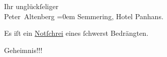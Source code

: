 \pstart
           Ihr unglückſeliger{\\[\baselineskip]}\spacefill\mbox{Peter Altenberg}\pend
           \leftskip=0em{}
\pstart
           \noindent{}Semmering, Hotel Panhans.\pend
           
\pstart
           Es iſt ein \uline{Notſchrei} eines{ }ſchwerst
                  Bedrängten.\pend
           
\pstart
           \raggedleft{}Geheimnis!!!\pend
           \endnumbering{}  \newcommand{\dateiname}{L02094}\newcommand{\titel}{Peter Altenberg an Arthur Schnitzler, [7. 11. 1912]}\newcommand{\editorInnen}{Herausgegeben von Martin Anton Müller}
